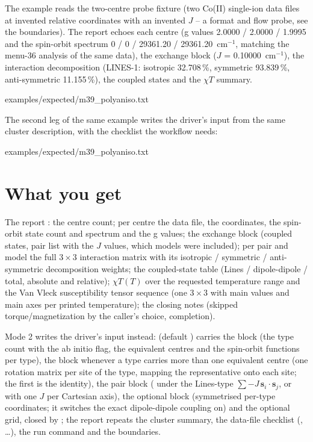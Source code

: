 The example reads the two-centre probe fixture (two Co(II) single-ion data
files at invented relative coordinates with an invented $J$ -- a format and
flow probe, see the boundaries).  The report echoes each centre (g values
2.0000 / 2.0000 / 1.9995 and the spin-orbit spectrum
0 / 0 / 29361.20 / 29361.20~cm$^{-1}$, matching the menu-36 analysis of the
same data), the exchange block ($J$ = 0.10000~cm$^{-1}$), the interaction
decomposition (LINES-1: isotropic 32.708\,\%, symmetric 93.839\,\%,
anti-symmetric 11.155\,\%), the coupled states and the $\chi T$ summary.


  {examples/expected/m39_polyaniso.txt}

The second leg of the same example writes the driver's input from the same
cluster description, with the checklist the workflow needs:


  {examples/expected/m39_polyaniso.txt}

\section{What you get}

The report : the centre count; per centre
the data file, the coordinates, the spin-orbit state count and spectrum
and the g values; the exchange block (coupled states, pair list with the
$J$ values, which models were included); per pair and model the full
$3\times3$ interaction matrix with its isotropic / symmetric /
anti-symmetric decomposition weights; the coupled-state table (Lines /
dipole-dipole / total, absolute and relative); $\chi T(T)$ over the
requested temperature range and the Van Vleck susceptibility tensor
sequence (one $3\times3$ with main values and main axes per printed
temperature); the closing notes (skipped torque/magnetization by the
caller's choice, completion).

Mode 2 writes the driver's input instead:  (default
) carries the  block (the type count
with the ab initio flag, the equivalent centres and the spin-orbit
functions per type), the  block whenever a type carries more
than one equivalent centre (one rotation matrix per site of the type,
mapping the representative onto each site; the first is the identity), the
pair block ( under the Lines-type
$\sum -J\,\mathbf{s}_i\cdot\mathbf{s}_j$, or  with one $J$ per
Cartesian axis), the optional  block (symmetrised per-type
coordinates; it switches the exact dipole-dipole coupling on) and the
optional  grid, closed by ; the report
 repeats the cluster summary, the data-file checklist
(, \ldots), the run command and the boundaries.

